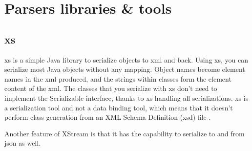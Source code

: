 \section{Parsers libraries \& tools}

\subsection{\gls{xs}}
\gls{xs} is a simple Java library to serialize objects to \gls{xml} and back. Using \gls{xs}, you can serialize most Java objects without any mapping. Object names become element names in the \gls{xml} produced, and the strings within classes form the element content of the \gls{xml}.
\newline
\newline
The classes that you serialize with \gls{xs} don't need to implement the Serializable interface, thanks to \gls{xs} handling all serializations. \gls{xs} is a serialization tool and not a data binding tool, which means that it doesn't perform class generation from an XML Schema Definition (\gls{xsd}) file \cite{bib:xstream} \cite{bib:ibm}.

\newpage

Another feature of XStream is that it has the capability to serialize to and from \gls{json} as well.

